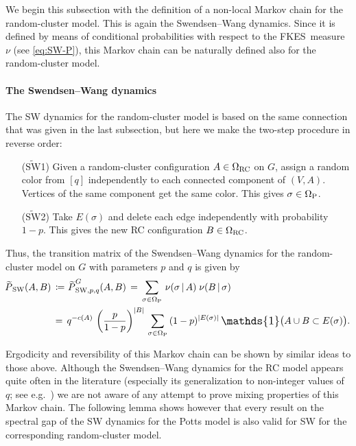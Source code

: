 \documentclass{dis}
\theoremstyle{citing}
\begin{document}
We begin this subsection with the definition of a non-local 
Markov chain for the random-cluster model. 
This is again the Swendsen--Wang dynamics.  
Since it is defined by means of conditional 
probabilities with respect to the {FKES}\ measure $\nu$ 
(see \eqref{eq:SW-P}), this Markov chain can be naturally defined also for 
the random-cluster model.

\paragraph{\bf The Swendsen--Wang dynamics}
The SW dynamics for the random-cluster model 
is based on the same connection that was given in the last 
subsection, but here we make the two-step procedure in 
reverse order:
\begin{enumerate}
	\item[(${\widetilde{{\text{SW}}}}$1)] Given a random-cluster configuration 
		$A\in{\Omega}_{\rm RC}$ on $G$, assign a random color from $[q]$ 
		independently to each connected component of $(V,A)$. 
		Vertices of the same component get the same color. 
		This gives $\sigma\in{\Omega}_{\rm P}$.		
	\item[(${\widetilde{{\text{SW}}}}$2)] Take $E(\sigma)$ and delete each edge 
		independently with probability $1-p$. 
		This gives the new RC configuration $B\in{\Omega}_{\rm RC}$.
\end{enumerate}
Thus, the transition matrix of the Swendsen--Wang dynamics 
for the random-cluster model on $G$ with parameters $p$ and $q$ 
is given by
\begin{equation} \label{eq:SW-RC}
\begin{split}
{{\raisebox{2pt}{ ${\widetilde{{}}}$ }\mkern-14mu P}_{\rm SW}}(A,B) \,&\coloneqq\, {\raisebox{2pt}{ ${\widetilde{{}}}$ }\mkern-14mu P}_{{\rm SW},p,q}^G(A,B) 
\,=\, \sum_{\sigma\in{{\Omega}_{\rm P}}}\, \nu(\sigma \,|\, A)\; \nu(B \,|\, \sigma) \\
&=\, q^{-c(A)}\,\left(\frac{p}{1-p}\right)^{{\left\vert {B} \right\vert}}\,
	\sum_{\sigma\in{\Omega}_{\rm P}} \,(1-p)^{{\left\vert {E(\sigma)} \right\vert}}\,
		{\scalebox{1.2}{\raisebox{-0.2mm}{$\mathds{1}$}}}\bigl(A\cup B \subset E(\sigma)\bigr).
\end{split}
\end{equation}

Ergodicity and reversibility of this Markov chain can be shown by 
similar ideas to those above.
Although the Swendsen--Wang dynamics for the RC model appears 
quite often in the literature (especially its generalization to 
non-integer values of $q$; see 
e.g.~\cite{CMachta1,CMachta2,DGMOS,DengQianBloete})
we are not aware of any attempt to prove mixing properties 
of this Markov chain. 
The following lemma shows however that every result on  
the spectral gap of the SW dynamics for the Potts model 
is also valid for SW for the corresponding random-cluster model.
\end{document}
